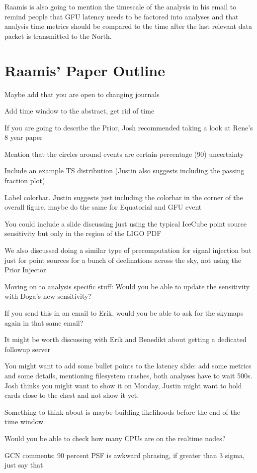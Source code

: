 Raamis is also going to mention the timescale of the analysis in his email to remind people that GFU latency needs to be factored into analyses and that analysis time metrics should be compared to the time after the last relevant data packet is transmitted to the North. 

\section{Raamis' Paper Outline}
\begin{my_list_item}
    \item Maybe add that you are open to changing journals
    \item Add time window to the abstract, get rid of time
    \item If you are going to describe the Prior, Josh recommended taking a look at Rene's 8 year paper
    \item Mention that the circles around events are certain percentage (90) uncertainty
    \item Include an example TS distribution (Justin also suggests including the passing fraction plot)
    \item Label colorbar. Justin suggests just including the colorbar in the corner of the overall figure, maybe do the same for Equatorial and GFU event
    \item You could include a slide discussing just using the typical IceCube point source sensitivity but only in the region of the LIGO PDF
    \item We also discussed doing a similar type of precomputation for signal injection but just for point sources for a bunch of declinations across the sky, not using the Prior Injector. 
    \item Moving on to analysis specific stuff: Would you be able to update the sensitivity with Doga's new sensitivity?
    \item If you send this in an email to Erik, would you be able to ask for the skymaps again in that same email?
    \item It might be worth discussing with Erik and Benedikt about getting a dedicated followup server
    \item You might want to add some bullet points to the latency slide: add some metrics and some details, mentioning filesystem crashes, both analyses have to wait 500s. Josh thinks you might want to show it on Monday, Justin might want to hold cards close to the chest and not show it yet. 
    \item Something to think about is maybe building likelihoods before the end of the time window
    \item Would you be able to check how many CPUs are on the realtime nodes?
    \item GCN comments: 90 percent PSF is awkward phrasing, if greater than 3 sigma, just say that
\end{my_list_item}

